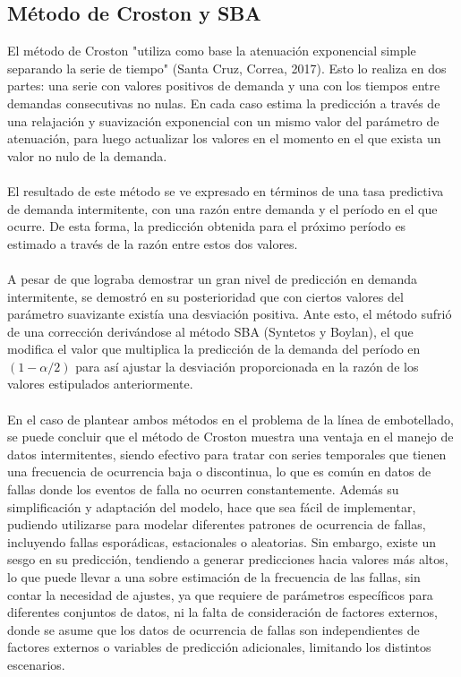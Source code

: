 \documentclass[10pt]{article}
\begin{document}
\subsection{Método de Croston y SBA}
El método de Croston "utiliza como base la atenuación exponencial simple separando la serie de tiempo" (Santa Cruz, Correa, 2017). Esto lo realiza en dos partes: una serie con valores positivos de demanda y una con los tiempos entre demandas consecutivas no nulas. En cada caso estima la predicción a través de una relajación y suavización exponencial con un mismo valor del parámetro de atenuación, para luego actualizar los valores en el momento en el que exista un valor no nulo de la demanda.\\
\\
El resultado de este método se ve expresado en términos de una tasa predictiva de demanda intermitente, con una razón entre demanda y el período en el que ocurre. De esta forma, la predicción obtenida para el próximo período es estimado a través de la razón entre estos dos valores.\\
\\
A pesar de que lograba demostrar un gran nivel de predicción en demanda intermitente, se demostró en su posterioridad que con ciertos valores del parámetro suavizante existía una desviación positiva. Ante esto, el método sufrió de una corrección derivándose al método SBA (Syntetos y Boylan), el que modifica el valor que multiplica la predicción de la demanda del período en ${(1-\alpha / 2)}$ para así ajustar la desviación proporcionada en la razón de los valores estipulados anteriormente.\\
\\
En el caso de plantear ambos métodos en el problema de la línea de embotellado, se puede concluir que el método de Croston muestra una ventaja en el manejo de datos intermitentes, siendo efectivo para tratar con series temporales que tienen una frecuencia de ocurrencia baja o discontinua, lo que es común en datos de fallas donde los eventos de falla no ocurren constantemente. Además su simplificación y adaptación del modelo, hace que sea fácil de implementar, pudiendo utilizarse para modelar diferentes patrones de ocurrencia de fallas, incluyendo fallas esporádicas, estacionales o aleatorias. Sin embargo, existe un sesgo en su predicción, tendiendo a generar predicciones hacia valores más altos, lo que puede llevar a una sobre estimación de la frecuencia de las fallas, sin contar la necesidad de ajustes, ya que requiere de parámetros específicos para diferentes conjuntos de datos, ni la falta de consideración de factores externos, donde se asume que los datos de ocurrencia de fallas son independientes de factores externos o variables de predicción adicionales, limitando los distintos escenarios.\\
\end{document}
